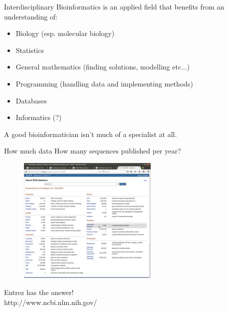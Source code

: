 \documentclass[pdf]{beamer}
\begin{document}
\begin{frame}{Interdisciplinary}
  Bioinformatics is an applied field that benefits from an
  understanding of:
  \begin{itemize}
    \item Biology (esp. molecular biology)
    \item Statistics
    \item General mathematics (finding solutions, modelling etc...)
    \item Programming (handling data and implementing methods)
    \item Databases
    \item Informatics (?)
  \end{itemize}
  \pause
  A good bioinformatician isn't much of a specialist at all.
\end{frame}

\begin{frame}{How much data}
  How many sequences published per year?
  \begin{figure}[ht]
    \includegraphics[width=0.6\textwidth]{images/NCBI_search_2014}
  \end{figure}
  Entrez has the answer!\\
  http://www.ncbi.nlm.nih.gov/
\end{frame}
\end{document}
